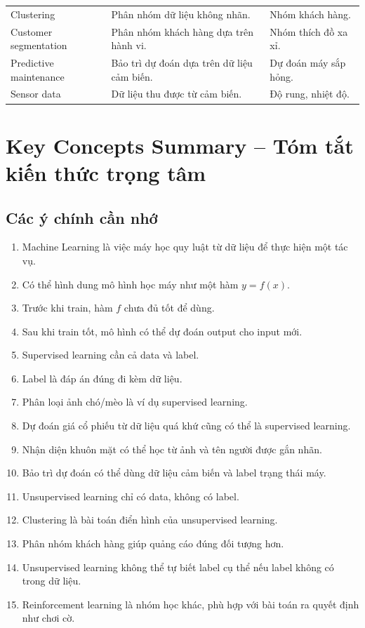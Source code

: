 \begin{longtable}{p{}p{}p{}}
Clustering & Phân nhóm dữ liệu không nhãn. & Nhóm khách hàng. \\

Customer segmentation & Phân nhóm khách hàng dựa trên hành vi. & Nhóm thích đồ xa xỉ. \\

Predictive maintenance & Bảo trì dự đoán dựa trên dữ liệu cảm biến. & Dự đoán máy sắp hỏng. \\

Sensor data & Dữ liệu thu được từ cảm biến. & Độ rung, nhiệt độ. \\

\bottomrule
\end{longtable}
\normalsize

\section{Key Concepts Summary -- Tóm tắt kiến thức trọng tâm}

\subsection{Các ý chính cần nhớ}

\begin{enumerate}
    \item Machine Learning là việc máy học quy luật từ dữ liệu để thực hiện một tác vụ.
    \item Có thể hình dung mô hình học máy như một hàm $y=f(x)$.
    \item Trước khi train, hàm $f$ chưa đủ tốt để dùng.
    \item Sau khi train tốt, mô hình có thể dự đoán output cho input mới.
    \item Supervised learning cần cả data và label.
    \item Label là đáp án đúng đi kèm dữ liệu.
    \item Phân loại ảnh chó/mèo là ví dụ supervised learning.
    \item Dự đoán giá cổ phiếu từ dữ liệu quá khứ cũng có thể là supervised learning.
    \item Nhận diện khuôn mặt có thể học từ ảnh và tên người được gắn nhãn.
    \item Bảo trì dự đoán có thể dùng dữ liệu cảm biến và label trạng thái máy.
    \item Unsupervised learning chỉ có data, không có label.
    \item Clustering là bài toán điển hình của unsupervised learning.
    \item Phân nhóm khách hàng giúp quảng cáo đúng đối tượng hơn.
    \item Unsupervised learning không thể tự biết label cụ thể nếu label không có trong dữ liệu.
    \item Reinforcement learning là nhóm học khác, phù hợp với bài toán ra quyết định như chơi cờ.
\end{enumerate}

